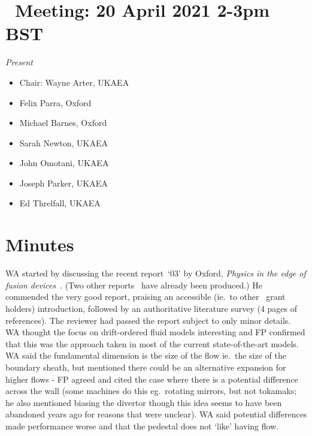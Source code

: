 \section{{\nep\  Meeting: 20 April 2021 2-3pm BST}}

\emph{Present}

\begin{itemize}
\item Chair: Wayne Arter, UKAEA
\item Felix Parra, Oxford
\item Michael Barnes, Oxford
\item Sarah Newton, UKAEA
\item John Omotani, UKAEA
\item Joseph Parker, UKAEA
\item Ed Threlfall, UKAEA

\end{itemize}

\section{Minutes}

WA started by discussing the recent report~`03' by Oxford, {\it Physics in the edge 
of fusion devices}~\cite{2047357-TN-03}.  (Two other
reports~\cite{2047357-TN-01,2047357-TN-02}  have already been
produced.) He commended the very good report, 
praising an accessible (ie.\ to other \nep\  grant holders) introduction, 
followed by an authoritative literature survey (4 pages of references).  The 
reviewer had passed the report subject to only minor details.  WA thought the 
focus on drift-ordered fluid models interesting and FP confirmed that this was 
the approach taken in most of the current state-of-the-art models.  WA said the 
fundamental dimension is the size of the flow ie.\ the size of the boundary 
sheath, but mentioned there could be an alternative expansion for higher flows 
- FP agreed and cited the case where there is a potential difference across the 
wall (some machines do this eg.\ rotating mirrors, but not tokamaks; he also 
mentioned biasing the divertor though this idea seems to have been abandoned 
years ago for reasons that were unclear).  WA said potential differences made 
performance worse and that the pedestal does not `like' having flow.

